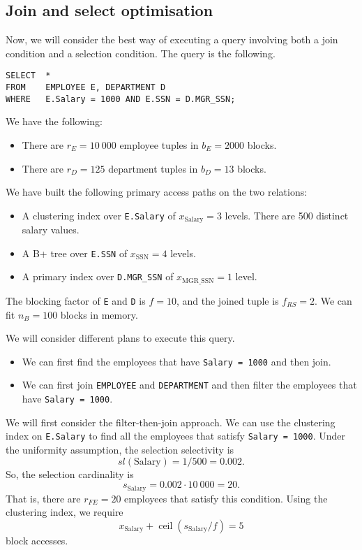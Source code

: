 \documentclass[a4paper, openany]{memoir}
\theoremstyle{definition}
\theoremstyle{plain}
\begin{document}
\subsection{Join and select optimisation}
Now, we will consider the best way of executing a query involving both a join condition and a selection condition. The query is the following.
\begin{verbatim}
SELECT  *
FROM    EMPLOYEE E, DEPARTMENT D
WHERE   E.Salary = 1000 AND E.SSN = D.MGR_SSN;
\end{verbatim}
We have the following:
\begin{itemize}
    \item There are $r_E = 10 \ 000$ employee tuples in $b_E = 2000$ blocks.
    \item There are $r_D = 125$ department tuples in $b_D = 13$ blocks.
\end{itemize}
We have built the following primary access paths on the two relations:
\begin{itemize}
    \item A clustering index over \texttt{E.Salary} of $x_{\text{Salary}} = 3$ levels. There are 500 distinct salary values.
    \item A B+ tree over \texttt{E.SSN} of $x_{\text{SSN}} = 4$ levels.
    \item A primary index over \texttt{D.MGR\_SSN}  of $x_{\text{MGR\_SSN}} = 1$ level.
\end{itemize}
The blocking factor of \texttt{E} and \texttt{D} is $f = 10$, and the joined tuple is $f_{RS} = 2$. We can fit $n_B = 100$ blocks in memory.

We will consider different plans to execute this query.
\begin{itemize}
    \item We can first find the employees that have \texttt{Salary = 1000} and then join.
    \item We can first join \texttt{EMPLOYEE} and \texttt{DEPARTMENT} and then filter the employees that have \texttt{Salary = 1000}.
\end{itemize}

We will first consider the filter-then-join approach. We can use the clustering index on \texttt{E.Salary} to find all the employees that satisfy \texttt{Salary = 1000}. Under the uniformity assumption, the selection selectivity is
\[\textit{sl}(\text{Salary}) = 1/500 = 0.002.\]
So, the selection cardinality is
\[s_{\text{Salary}} = 0.002 \cdot 10 \ 000 = 20.\]
That is, there are $r_{FE} = 20$ employees that satisfy this condition. Using the clustering index, we require
\[x_{\text{Salary}} + \operatorname{ceil}(s_{\text{Salary}}/f) = 5\]
block accesses.
\end{document}
